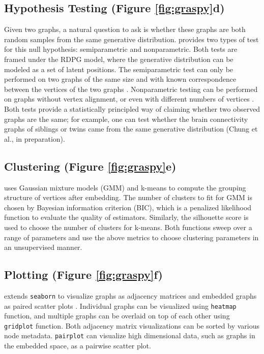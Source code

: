 \subsection{Hypothesis Testing (Figure \ref{fig:graspy}d)}
Given two graphs, a natural question to ask is whether these graphs are both random samples from the same generative distribution. \graspy provides two types of test for this null hypothesis: semiparametric and nonparametric. Both tests are framed under the RDPG model, where the generative distribution can be modeled as a set of latent positions. The semiparametric test can only be performed on two graphs of the same size and with known correspondence between the vertices of the two graphs \cite{tang2017semiparametric}. Nonparametric testing can be performed on graphs without vertex alignment, or even with different numbers of vertices \cite{tang2014nonparametric}. Both tests provide a statistically principled way of claiming whether two observed graphs are the same; for example, one can test whether the brain connectivity graphs of siblings or twins came from the same generative distribution (Chung et al., in preparation). 

\subsection{Clustering (Figure \ref{fig:graspy}e)}
\graspy uses Gaussian mixture models (GMM) and k-means to compute the grouping structure of vertices after embedding. The number of clusters to fit for GMM is chosen by Bayesian information criterion (BIC), which is a penalized likelihood function to evaluate the quality of estimators. Similarly, the silhouette score is used to choose the number of clusters for k-means. Both functions sweep over a range of parameters and use the above metrics to choose clustering parameters in an unsupervised manner. 

\subsection{Plotting (Figure \ref{fig:graspy}f)}
\graspy extends \texttt{seaborn} to visualize graphs as adjacency matrices and embedded graphs as paired scatter plots \cite{seaborn}. Individual graphs can be visualized using \texttt{heatmap} function, and multiple graphs can be overlaid on top of each other using \texttt{gridplot} function. Both adjacency matrix visualizations can be sorted by various node metadata. \texttt{pairplot} can visualize high dimensional data, such as graphs in the embedded space, as a pairwise scatter plot.

